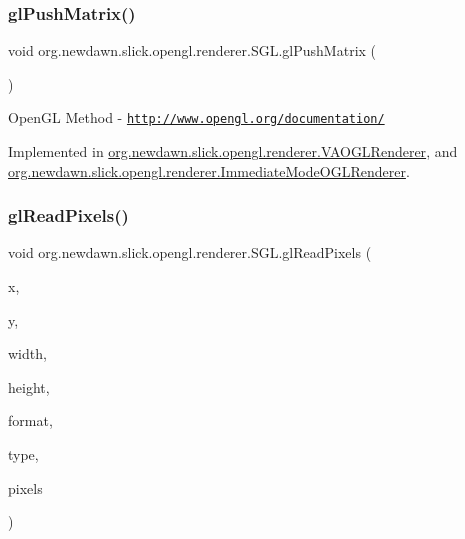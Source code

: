\subsubsection{\texorpdfstring{gl\+Push\+Matrix()}{glPushMatrix()}}
{\footnotesize\ttfamily void org.\+newdawn.\+slick.\+opengl.\+renderer.\+S\+G\+L.\+gl\+Push\+Matrix (\begin{DoxyParamCaption}{ }\end{DoxyParamCaption})}

Open\+GL Method -\/  \href{http://www.opengl.org/documentation/}{\tt http\+://www.\+opengl.\+org/documentation/} 

Implemented in \mbox{\hyperlink{classorg_1_1newdawn_1_1slick_1_1opengl_1_1renderer_1_1_v_a_o_g_l_renderer_ac7380f97b774917d89fbb56270180be4}{org.\+newdawn.\+slick.\+opengl.\+renderer.\+V\+A\+O\+G\+L\+Renderer}}, and \mbox{\hyperlink{classorg_1_1newdawn_1_1slick_1_1opengl_1_1renderer_1_1_immediate_mode_o_g_l_renderer_ab8bdefea69c51370d849bd1fe814cc9d}{org.\+newdawn.\+slick.\+opengl.\+renderer.\+Immediate\+Mode\+O\+G\+L\+Renderer}}.

\mbox{\label{interfaceorg_1_1newdawn_1_1slick_1_1opengl_1_1renderer_1_1_s_g_l_a6a734843b3a3bb87604d439da37f4e74}} 
\subsubsection{\texorpdfstring{gl\+Read\+Pixels()}{glReadPixels()}}
{\footnotesize\ttfamily void org.\+newdawn.\+slick.\+opengl.\+renderer.\+S\+G\+L.\+gl\+Read\+Pixels (\begin{DoxyParamCaption}\item[{int}]{x,  }\item[{int}]{y,  }\item[{int}]{width,  }\item[{int}]{height,  }\item[{int}]{format,  }\item[{int}]{type,  }\item[{Byte\+Buffer}]{pixels }\end{DoxyParamCaption})}

